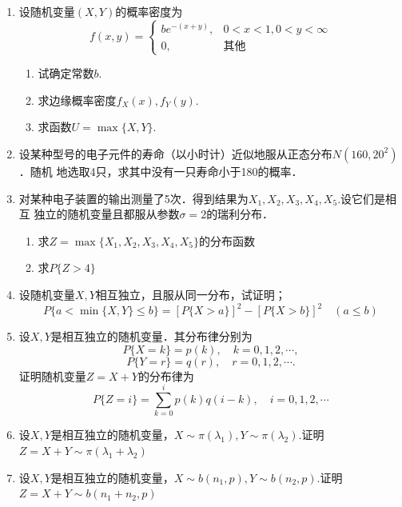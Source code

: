 \begin{enumerate}
    \item 设随机变量$(X,Y)$的概率密度为
    $$f(x,y)=\left\{\begin{array}{ll}
        be^{-(x+y)}, & 0<x<1,0<y<\infty\\
        0, & \mbox{其他}
    \end{array}\right.$$
    \begin{enumerate}
        \item 试确定常数$b$.
        \item 求边缘概率密度$f_X(x),f_Y(y)$.
        \item 求函数$U=\max\{X,Y\}$.
    \end{enumerate}
   


    \item 设某种型号的电子元件的寿命（以小时计）近似地服从正态分布$N(160,20^2)$．随机
    地选取4只，求其中没有一只寿命小于180的概率．



    \item 对某种电子装置的输出测量了5次．得到结果为$X_1,X_2,X_3,X_4,X_5$.设它们是相互
    独立的随机变量且都服从参数$\sigma=2$的瑞利分布．
    \begin{enumerate}
        \item 求$Z=\max \{X_1,X_2,X_3,X_4,X_5\}$的分布函数
        \item 求$P\{Z>4\}$
    \end{enumerate}


    \item 设随机变量$X,Y$相互独立，且服从同一分布，试证明；
    $$P\{a<\min \{X,Y\} \leq b\}={[P\{X>a\}]}^2-{[P\{X>b\}]}^2\quad (a\leq b)$$


    \item 设$X,Y$是相互独立的随机变量．其分布律分别为
    $$P\{X=k\}=p(k),\quad k=0,1,2,\cdots,$$
    $$P\{Y=r\}=q(r),\quad r=0,1,2,\cdots.$$
    证明随机变量$Z=X+Y$的分布律为
    $$P\{Z=i\}=\sum _{k=0}^i p(k)q(i-k),\quad i=0,1,2,\cdots$$


    \item 设$X,Y$是相互独立的随机变量，$X\sim \pi(\lambda_1),Y\sim \pi(\lambda_2)$.证明$Z=X+Y\sim \pi(\lambda_1+\lambda_2)$
    
    
    
    \item 设$X,Y$是相互独立的随机变量，$X\sim b(n_1,p),Y\sim b(n_2,p)$.证明$Z=X+Y\sim b(n_1+n_2,p)$
    


\end{enumerate}
